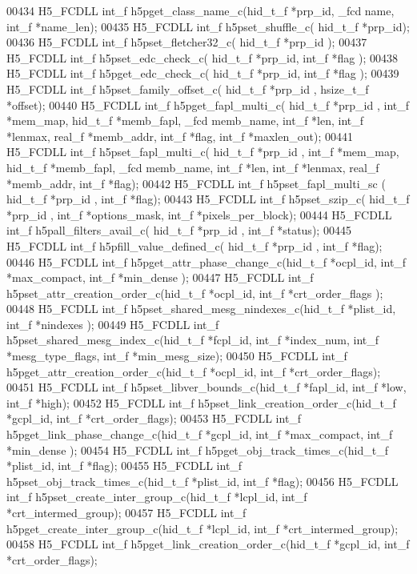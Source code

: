 \begin{DoxyCode}
00434 H5\_FCDLL int\_f h5pget\_class\_name\_c(hid\_t\_f *prp\_id, \_fcd name, int\_f *name\_len);
00435 H5\_FCDLL int\_f h5pset\_shuffle\_c( hid\_t\_f *prp\_id);
00436 H5\_FCDLL int\_f h5pset\_fletcher32\_c( hid\_t\_f *prp\_id );
00437 H5\_FCDLL int\_f h5pset\_edc\_check\_c( hid\_t\_f *prp\_id, int\_f *flag );
00438 H5\_FCDLL int\_f h5pget\_edc\_check\_c( hid\_t\_f *prp\_id, int\_f *flag );
00439 H5\_FCDLL int\_f h5pset\_family\_offset\_c( hid\_t\_f *prp\_id , hsize\_t\_f *offset);
00440 H5\_FCDLL int\_f h5pget\_fapl\_multi\_c( hid\_t\_f *prp\_id , int\_f *mem\_map, hid\_t\_f *memb\_fapl, \_fcd memb\_name, 
      int\_f *len, int\_f *lenmax, real\_f *memb\_addr, int\_f *flag, int\_f *maxlen\_out);
00441 H5\_FCDLL int\_f h5pset\_fapl\_multi\_c( hid\_t\_f *prp\_id , int\_f *mem\_map, hid\_t\_f *memb\_fapl, \_fcd memb\_name, 
      int\_f *len, int\_f *lenmax, real\_f *memb\_addr, int\_f *flag);
00442 H5\_FCDLL int\_f h5pset\_fapl\_multi\_sc ( hid\_t\_f *prp\_id , int\_f *flag);
00443 H5\_FCDLL int\_f h5pset\_szip\_c( hid\_t\_f *prp\_id , int\_f *options\_mask, int\_f *pixels\_per\_block);
00444 H5\_FCDLL int\_f h5pall\_filters\_avail\_c( hid\_t\_f *prp\_id , int\_f *status);
00445 H5\_FCDLL int\_f h5pfill\_value\_defined\_c( hid\_t\_f *prp\_id , int\_f *flag);
00446 H5\_FCDLL int\_f h5pget\_attr\_phase\_change\_c(hid\_t\_f *ocpl\_id, int\_f *max\_compact, int\_f *min\_dense );
00447 H5\_FCDLL int\_f h5pset\_attr\_creation\_order\_c(hid\_t\_f *ocpl\_id, int\_f *crt\_order\_flags );
00448 H5\_FCDLL int\_f h5pset\_shared\_mesg\_nindexes\_c(hid\_t\_f *plist\_id, int\_f *nindexes );
00449 H5\_FCDLL int\_f h5pset\_shared\_mesg\_index\_c(hid\_t\_f *fcpl\_id, int\_f *index\_num, int\_f *mesg\_type\_flags, int\_f
       *min\_mesg\_size);
00450 H5\_FCDLL int\_f h5pget\_attr\_creation\_order\_c(hid\_t\_f *ocpl\_id, int\_f *crt\_order\_flags);
00451 H5\_FCDLL int\_f h5pset\_libver\_bounds\_c(hid\_t\_f *fapl\_id, int\_f *low, int\_f *high);
00452 H5\_FCDLL int\_f h5pset\_link\_creation\_order\_c(hid\_t\_f *gcpl\_id, int\_f *crt\_order\_flags);
00453 H5\_FCDLL int\_f h5pget\_link\_phase\_change\_c(hid\_t\_f *gcpl\_id, int\_f *max\_compact, int\_f *min\_dense );
00454 H5\_FCDLL int\_f h5pget\_obj\_track\_times\_c(hid\_t\_f *plist\_id, int\_f *flag);
00455 H5\_FCDLL int\_f h5pset\_obj\_track\_times\_c(hid\_t\_f *plist\_id, int\_f *flag);
00456 H5\_FCDLL int\_f h5pset\_create\_inter\_group\_c(hid\_t\_f *lcpl\_id, int\_f *crt\_intermed\_group);
00457 H5\_FCDLL int\_f h5pget\_create\_inter\_group\_c(hid\_t\_f *lcpl\_id, int\_f *crt\_intermed\_group);
00458 H5\_FCDLL int\_f h5pget\_link\_creation\_order\_c(hid\_t\_f *gcpl\_id, int\_f *crt\_order\_flags);

\end{DoxyCode}
